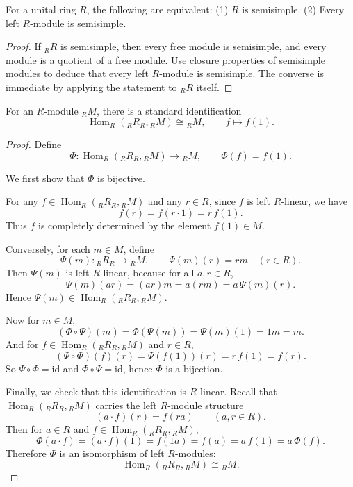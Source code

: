 \begin{lemma}
    For a unital ring $R$, the following are equivalent:
    (1) $R$ is semisimple.
    (2) Every left $R$-module is semisimple.
\end{lemma}

\begin{proof}
    If ${}_R R$ is semisimple, then every free module is semisimple, and every module is a quotient of a free module.
    Use closure properties of semisimple modules to deduce that every left $R$-module is semisimple.
    The converse is immediate by applying the statement to ${}_R R$ itself.
\end{proof}

\begin{lemma}
    For an $R$-module ${}_RM$, there is a standard identification
    \[
        \operatorname{Hom}_R({}_RR_R, {}_RM) \cong {}_RM,
        \qquad
        f \longmapsto f(1).
    \]
\end{lemma}

\begin{proof}
    Define
    \[
        \Phi:\operatorname{Hom}_R({}_RR_R,{}_RM)\longrightarrow {}_RM,
        \qquad
        \Phi(f)=f(1).
    \]

    We first show that $\Phi$ is bijective.

    For any $f\in \operatorname{Hom}_R({}_RR_R,{}_RM)$ and any $r\in R$, since $f$ is
    left $R$-linear, we have
    \[
        f(r)=f(r\cdot 1)=r\,f(1).
    \]
    Thus $f$ is completely determined by the element $f(1)\in M$.

    Conversely, for each $m\in M$, define
    \[
        \Psi(m):{}_RR_R\longrightarrow {}_RM,
        \qquad
        \Psi(m)(r)=rm
        \quad (r\in R).
    \]
    Then $\Psi(m)$ is left $R$-linear, because for all $a,r\in R$,
    \[
        \Psi(m)(ar)=(ar)m=a(rm)=a\,\Psi(m)(r).
    \]
    Hence $\Psi(m)\in \operatorname{Hom}_R({}_RR_R,{}_RM)$.

    Now for $m\in M$,
    \[
        (\Phi\circ \Psi)(m)=\Phi(\Psi(m))=\Psi(m)(1)=1m=m.
    \]
    And for $f\in \operatorname{Hom}_R({}_RR_R,{}_RM)$ and $r\in R$,
    \[
        (\Psi\circ\Phi)(f)(r)=\Psi(f(1))(r)=r\,f(1)=f(r).
    \]
    So $\Psi\circ\Phi=\mathrm{id}$ and $\Phi\circ\Psi=\mathrm{id}$, hence $\Phi$ is a bijection.

    Finally, we check that this identification is $R$-linear. Recall that
    $\operatorname{Hom}_R({}_RR_R,{}_RM)$ carries the left $R$-module structure
    \[
        (a\cdot f)(r)=f(ra)
        \qquad (a,r\in R).
    \]
    Then for $a\in R$ and $f\in \operatorname{Hom}_R({}_RR_R,{}_RM)$,
    \[
        \Phi(a\cdot f)=(a\cdot f)(1)=f(1a)=f(a)=a\,f(1)=a\,\Phi(f).
    \]
    Therefore $\Phi$ is an isomorphism of left $R$-modules:
    \[
        \operatorname{Hom}_R({}_RR_R,{}_RM)\cong {}_RM.
    \]
\end{proof}

